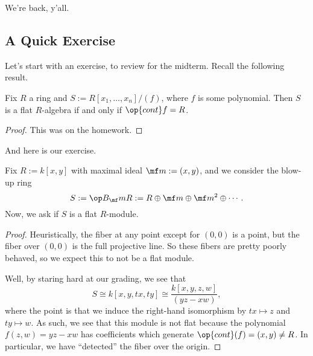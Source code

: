 
We're back, y'all.

\subsection{A Quick Exercise}
Let's start with an exercise, to review for the midterm. Recall the following result.
\begin{lem}[Eisenbud 6.4]
	Fix $R$ a ring and $S:=R[x_1,\ldots,x_n]/(f)$, where $f$ is some polynomial. Then $S$ is a flat $R$-algebra if and only if $\op{cont}f=R$.
\end{lem}
\begin{proof}
	This was on the homework.
\end{proof}
And here is our exercise.
\begin{exe}
	Fix $R:=k[x,y]$ with maximal ideal $\mf m:=(x,y)$, and we consider the blow-up ring
	\[S:=\op B_\mf mR:=R\oplus\mf m\oplus\mf m^2\oplus\cdots.\]
	Now, we ask if $S$ is a flat $R$-module.
\end{exe}
\begin{proof}
	Heuristically, the fiber at any point except for $(0,0)$ is a point, but the fiber over $(0,0)$ is the full projective line. So these fibers are pretty poorly behaved, so we expect this to not be a flat module.

	Well, by staring hard at our grading, we see that
	\[S\cong k[x,y,tx,ty]\cong\frac{k[x,y,z,w]}{(yz-xw)},\]
	where the point is that we induce the right-hand isomorphism by $tx\mapsto z$ and $ty\mapsto w$. As such, we see that this module is not flat because the polynomial $f(z,w)=yz-xw$ has coefficients which generate $\op{cont}(f)=(x,y)\ne R$. In particular, we have ``detected'' the fiber over the origin.
\end{proof}

